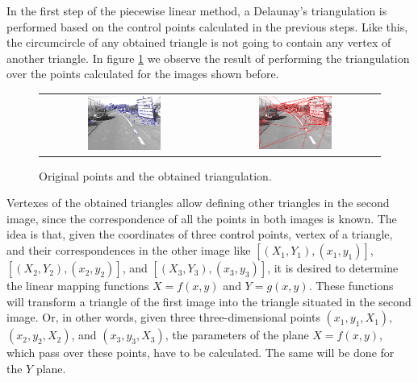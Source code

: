 In the first step of the piecewise linear method, a Delaunay’s triangulation is performed based on the control points calculated in the previous steps. Like this, the circumcircle of any obtained triangle is not going to contain any vertex of another triangle. In figure \ref{fig:cp01_triangulation} we observe the result of performing the triangulation over the points calculated for the images shown before.

\begin{figure}[h!]
\begin{tabular}{cc}
\includegraphics[width=0.45\textwidth]{triangulation1}\label{fig:cp01_triangulation_1} &
\includegraphics[width=0.45\textwidth]{triangulation2}\label{fig:cp01_triangulation_2}
\end{tabular}
\caption{Original points and the obtained triangulation.}\label{fig:cp01_triangulation}
\end{figure}

Vertexes of the obtained triangles allow defining other triangles in the second image, since the correspondence of all the points in both images is known. The idea is that, given the coordinates of three control points, vertex of a triangle, and their correspondences in the other image like $[(X_1, Y_1), (x_1, y_1)]$, $[(X_2, Y_2), (x_2, y_2)]$, and $[(X_3, Y_3), (x_3, y_3)]$, it is desired to determine the linear mapping functions $X = f(x, y)$ and $Y = g(x, y)$. These functions will transform a triangle of the first image into the triangle situated in the second image. Or, in other words, given three three-dimensional points $(x_1, y_1, X_1)$, $(x_2, y_2, X_2)$, and $(x_3, y_3, X_3)$, the parameters of the plane $X = f(x, y)$, which pass over these points, have to be calculated. The same will be done for the $Y$ plane.


